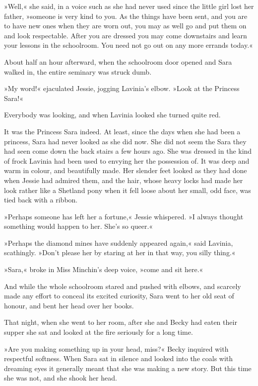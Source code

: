 »Well,« she said, in a voice such as she had never used since the little girl lost her father, »someone is very kind to you. As the things have been sent, and you are to have new ones when they are worn out, you may as well go and put them on and look respectable. After you are dressed you may come downstairs and learn your lessons in the schoolroom. You need not go out on any more errands today.«

About half an hour afterward, when the schoolroom door opened and Sara walked in, the entire seminary was struck dumb.

»My word!« ejaculated Jessie, jogging Lavinia's elbow. »Look at the Princess Sara!«

Everybody was looking, and when Lavinia looked she turned quite red.

It was the Princess Sara indeed. At least, since the days when she had been a princess, Sara had never looked as she did now. She did not seem the Sara they had seen come down the back stairs a few hours ago. She was dressed in the kind of frock Lavinia had been used to envying her the possession of. It was deep and warm in colour, and beautifully made. Her slender feet looked as they had done when Jessie had admired them, and the hair, whose heavy locks had made her look rather like a Shetland pony when it fell loose about her small, odd face, was tied back with a ribbon.

»Perhaps someone has left her a fortune,« Jessie whispered. »I always thought something would happen to her. She's so queer.«

»Perhaps the diamond mines have suddenly appeared again,« said Lavinia, scathingly. »Don't please her by staring at her in that way, you silly thing.«

»Sara,« broke in Miss Minchin's deep voice, »come and sit here.«

And while the whole schoolroom stared and pushed with elbows, and scarcely made any effort to conceal its excited curiosity, Sara went to her old seat of honour, and bent her head over her books.

That night, when she went to her room, after she and Becky had eaten their supper she sat and looked at the fire seriously for a long time.

»Are you making something up in your head, miss?« Becky inquired with respectful softness. When Sara sat in silence and looked into the coals with dreaming eyes it generally meant that she was making a new story. But this time she was not, and she shook her head.

